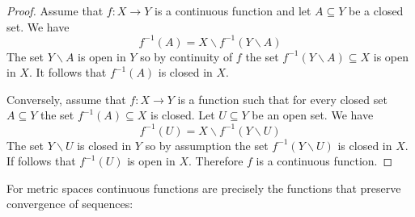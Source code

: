 \documentclass[11pt, letterpaper, oneside]{report}
\theoremstyle{pplain}
\newtheorem{ITERMVALUE THM}[theorem]{Intermediate Value Theorem}
\newtheorem{HEINEBOREL THM}[theorem]{Heine-Borel Theorem}
\newtheorem{UMETR THM}[theorem]{Urysohn Metrization Theorem}
\newtheorem{UMETR2 THM}[theorem]{Urysohn Metrization Theorem (v.2)}
\theoremstyle{ddefinition}
\theoremstyle{nnn}
\newtheorem{TDA NN}[theorem]{Topological Data Analysis. }
\theoremstyle{eexercise}
\newcommand{\ssmin}{\smallsetminus}
\begin{document}
 \begin{proof}
Assume that  $f\colon X\to Y$ is a continuous function and let $A\subseteq Y$ be a closed 
set. We have 
$$f^{-1}(A) = X\ssmin f^{-1}(Y\ssmin A)$$
The set $Y\ssmin A$ is open in $Y$ so by continuity of $f$ the set $f^{-1}(Y\ssmin A)\subseteq X$
is open in $X$. It follows that $f^{-1}(A)$ is closed in $X$. 

Conversely, assume that $f\colon X\to Y$ is a function such that for every  closed set $A\subseteq Y$
the set $f^{-1}(A)\subseteq X$ is closed. Let $U\subseteq Y$ be an open set. We have  
$$f^{-1}(U) = X\ssmin f^{-1}(Y\ssmin U)$$
The set $Y\ssmin U$ is closed in $Y$ so by assumption 
the set $f^{-1}(Y\ssmin U)$ is closed in $X$. 
If follows that $f^{-1}(U)$ is open  in $X$. Therefore $f$ is a continuous function. 
 \end{proof}


For metric spaces continuous functions are precisely the functions that preserve convergence of sequences:
\end{document}
